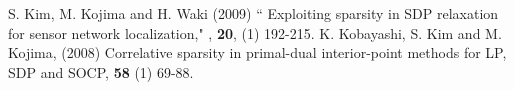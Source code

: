 \documentclass[12pt]{article}
\begin{document}
\begin{thebibliography}{99}
S. Kim, M. Kojima  and H. Waki (2009) 
\newblock `` Exploiting sparsity in SDP relaxation for sensor network localization,"
, {\bf 20}, (1) 192-215.
K. Kobayashi, S. Kim and M. Kojima, (2008)
\newblock Correlative sparsity in primal-dual interior-point methods for LP, SDP and SOCP,
  {\bf 58} (1) 69-88.


% 

% 


 
 
 


\end{thebibliography}
\end{document}
